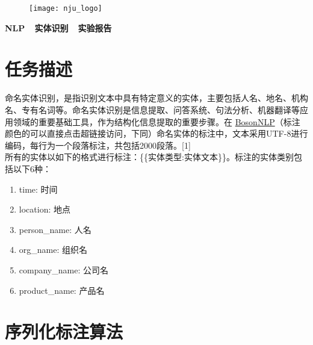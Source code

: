 \documentclass[11pt]{article}
\begin{document}
\begin{flushleft}
\begin{figure}[htb]
\texttt{[image: nju\_logo]}
\end{figure}
{\Huge{\textbf{NLP\ \ 实体识别\ \ 实验报告}}}\\
\end{flushleft}
\section{任务描述}
\hspace{1.6em} 命名实体识别，是指识别文本中具有特定意义的实体，主要包括人名、地名、机构名、专有名词等。命名实体识别是信息提取、问答系统、句法分析、机器翻译等应用领域的重要基础工具，作为结构化信息提取的重要步骤。在 \href{http://bosonnlp.com}{BosonNLP}（标注颜色的可以直接点击超链接访问，下同）命名实体的标注中，文本采用UTF-8进行编码，每行为一个段落标注，共包括2000段落。[1]\\
\indent 所有的实体以如下的格式进行标注：\{\{实体类型:实体文本\}\}。标注的实体类别包括以下6种：
\begin{enumerate}
\setlength{\itemsep}{-5pt}
\item time: 时间
\item location: 地点
\item person\_name: 人名
\item org\_name: 组织名
\item company\_name: 公司名
\item product\_name: 产品名
\end{enumerate}

\section{序列化标注算法}
\end{document}
